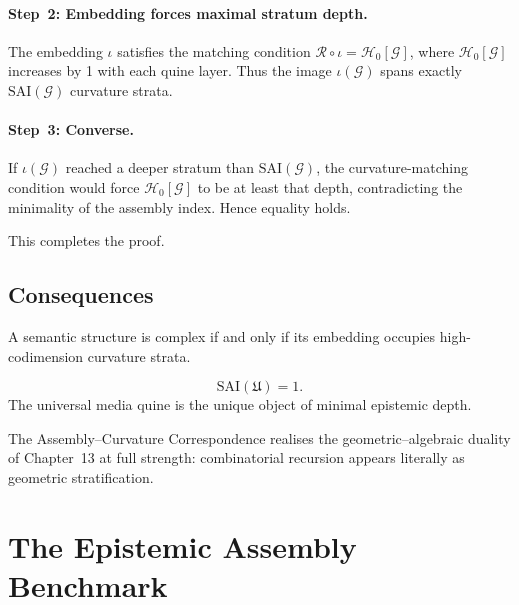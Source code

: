 \paragraph{Step~2: Embedding forces maximal stratum depth.}
The embedding $\iota$ satisfies the matching condition
$\mathcal{R}\circ\iota = \mathcal{H}_0[\mathcal{G}]$, where
$\mathcal{H}_0[\mathcal{G}]$ increases by 1 with each quine layer.
Thus the image $\iota(\mathcal{G})$ spans exactly
$\mathrm{SAI}(\mathcal{G})$ curvature strata.

\paragraph{Step~3: Converse.}
If $\iota(\mathcal{G})$ reached a deeper stratum than
$\mathrm{SAI}(\mathcal{G})$, the curvature-matching condition would force
$\mathcal{H}_0[\mathcal{G}]$ to be at least that depth, contradicting the
minimality of the assembly index.
Hence equality holds.

\medskip

This completes the proof.



\subsection{Consequences}

\begin{corollary}
A semantic structure is complex if and only if its embedding occupies
high-codimension curvature strata.
\end{corollary}

\begin{corollary}
\[
\mathrm{SAI}(\mathfrak{U}) = 1.
\]
The universal media quine is the unique object of minimal epistemic depth.
\end{corollary}

\begin{remark}
The Assembly--Curvature Correspondence realises the geometric--algebraic
duality of Chapter~13 at full strength:
combinatorial recursion appears literally as geometric stratification.
\end{remark}



\section{The Epistemic Assembly Benchmark}

